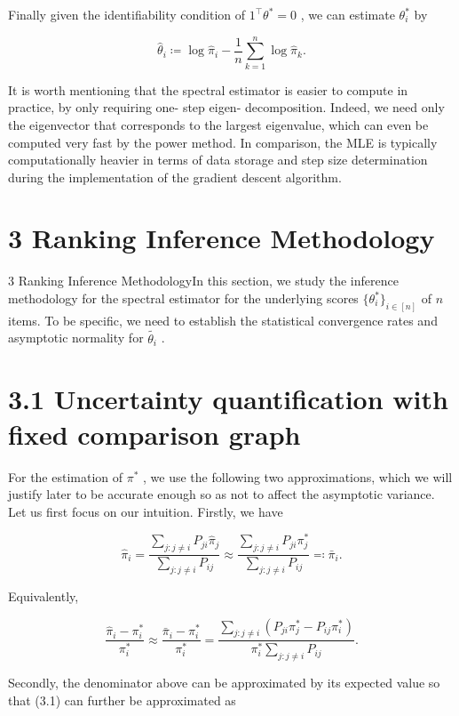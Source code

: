 Finally given the identifiability condition of
\(1^{\top}\theta^{*} = 0\) , we can estimate \(\theta_{i}^{*}\) by

\[
\widehat{\theta}_{i}\coloneqq \log \widehat{\pi}_{i} - \frac{1}{n}\sum_{k = 1}^{n}\log \widehat{\pi}_{k}. \tag{2.1}
\]

It is worth mentioning that the spectral estimator is easier to compute
in practice, by only requiring one- step eigen- decomposition. Indeed,
we need only the eigenvector that corresponds to the largest eigenvalue,
which can even be computed very fast by the power method. In comparison,
the MLE is typically computationally heavier in terms of data storage
and step size determination during the implementation of the gradient
descent algorithm.

\section{3 Ranking Inference
Methodology}\label{ranking-inference-methodology}

3 Ranking Inference MethodologyIn this section, we study the inference
methodology for the spectral estimator for the underlying scores
\(\{\theta_{i}^{*}\}_{i\in [n]}\) of \(n\) items. To be specific, we
need to establish the statistical convergence rates and asymptotic
normality for \(\widetilde{\theta_{i}}\) .

\section{3.1 Uncertainty quantification with fixed comparison
graph}\label{uncertainty-quantification-with-fixed-comparison-graph}

For the estimation of \(\pi^{*}\) , we use the following two
approximations, which we will justify later to be accurate enough so as
not to affect the asymptotic variance. Let us first focus on our
intuition. Firstly, we have

\[
\widehat{\pi}_{i} = \frac{\sum_{j:j\neq i}P_{ji}\widehat{\pi}_{j}}{\sum_{j:j\neq i}P_{ij}}\approx \frac{\sum_{j:j\neq i}P_{ji}\pi_{j}^{*}}{\sum_{j:j\neq i}P_{ij}} \eqqcolon \bar{\pi}_{i}.
\]

Equivalently,

\[
\frac{\widehat{\pi}_{i} - \pi_{i}^{*}}{\pi_{i}^{*}}\approx \frac{\bar{\pi}_{i} - \pi_{i}^{*}}{\pi_{i}^{*}} = \frac{\sum_{j:j\neq i}(P_{ji}\pi_{j}^{*} - P_{ij}\pi_{i}^{*})}{\pi_{i}^{*}\sum_{j:j\neq i}P_{ij}}. \tag{3.1}
\]

Secondly, the denominator above can be approximated by its expected
value so that (3.1) can further be approximated as

